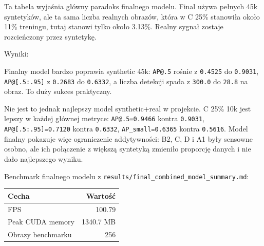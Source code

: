 \documentclass[
  11pt,
]{article}
\begin{document}
Ta tabela wyjaśnia główny paradoks finalnego modelu. Final używa pełnych
45k syntetyków, ale ta sama liczba realnych obrazów, która w C 25\%
stanowiła około 11\% treningu, tutaj stanowi tylko około 3.13\%. Realny
sygnał zostaje rozcieńczony przez syntetykę.

Wyniki:

\begingroup
{}
\noindent{}
\endgroup


Finalny model bardzo poprawia synthetic 45k: \texttt{AP@.5} rośnie z
\texttt{0.4525} do \texttt{0.9031}, \texttt{AP@{[}.5:.95{]}} z
\texttt{0.2683} do \texttt{0.6332}, a liczba detekcji spada z
\texttt{300.0} do \texttt{28.8} na obraz. To duży sukces praktyczny.

Nie jest to jednak najlepszy model synthetic+real w projekcie. C 25\%
10k jest lepszy w każdej głównej metryce: \texttt{AP@.5=0.9466} kontra
\texttt{0.9031}, \texttt{AP@{[}.5:.95{]}=0.7120} kontra \texttt{0.6332},
\texttt{AP\_small=0.6365} kontra \texttt{0.5616}. Model finalny pokazuje
więc ograniczenie addytywności: B2, C, D i A1 były sensowne osobno, ale
ich połączenie z większą syntetyką zmieniło proporcję danych i nie dało
najlepszego wyniku.

Benchmark finalnego modelu z
\texttt{results/final\_combined\_model\_summary.md}:

\begingroup
{}
\begin{tabularx}{\linewidth}{LR}
\toprule
Cecha & Wartość \\
\midrule

\bottomrule

FPS & 100.79 \\
Peak CUDA memory & 1340.7 MB \\
Obrazy benchmarku & 256 \\
\end{tabularx}
\endgroup
\end{document}
